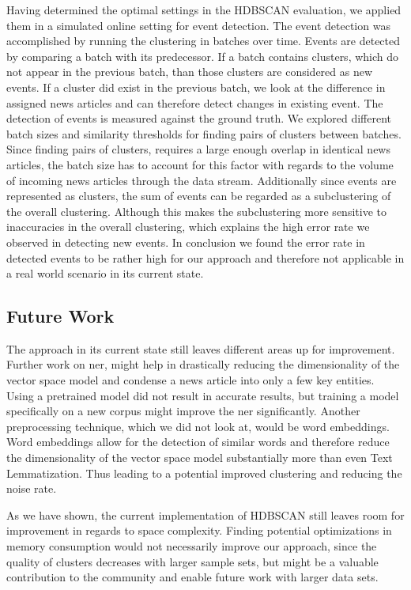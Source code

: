 Having determined the optimal settings in the HDBSCAN evaluation,
we applied them in a simulated online setting for event detection.
The event detection was accomplished by running the clustering in batches over time.
Events are detected by comparing a batch with its predecessor.
If a batch contains clusters, which do not appear in the previous batch,
than those clusters are considered as new events.
If a cluster did exist in the previous batch,
we look at the difference in assigned news articles and can therefore detect changes in existing event.
The detection of events is measured against the ground truth.
We explored different batch sizes and similarity thresholds for finding pairs of clusters between batches.
Since finding pairs of clusters, requires a large enough overlap in identical news articles,
the batch size has to account for this factor with regards to the volume of incoming news articles
through the data stream.
Additionally since events are represented as clusters,
the sum of events can be regarded as a subclustering of the overall clustering.
Although this makes the subclustering more sensitive to inaccuracies in the overall clustering,
which explains the high error rate we observed in detecting new events.
In conclusion we found the error rate in detected events to be rather high for our approach
and therefore not applicable in a real world scenario in its current state.

\subsection{Future Work}
\label{subsec:6_future_work}

The approach in its current state still leaves different areas up for improvement.
Further work on \Gls{ner}, might help in drastically reducing the dimensionality of the vector space model
and condense a news article into only a few key entities.
Using a pretrained model did not result in accurate results,
but training a model specifically on a new corpus might improve the \Gls{ner} significantly.
Another preprocessing technique, which we did not look at, would be word embeddings.
Word embeddings allow for the detection of similar words and therefore reduce the dimensionality
of the vector space model substantially more than even Text Lemmatization.
Thus leading to a potential improved clustering and reducing the noise rate.

As we have shown, the current implementation of HDBSCAN
still leaves room for improvement in regards to space complexity.
Finding potential optimizations in memory consumption would not necessarily improve our approach,
since the quality of clusters decreases with larger sample sets,
but might be a valuable contribution to the community and enable future work with larger data sets.

